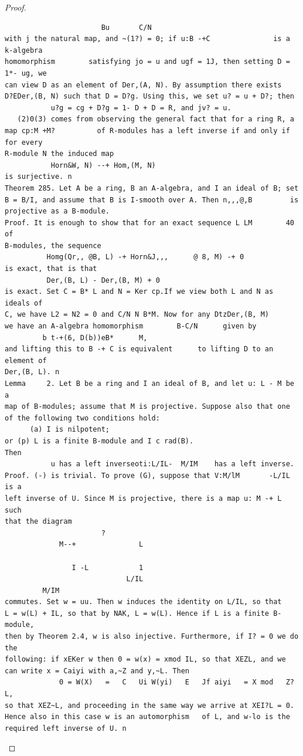 \begin{proof}
\begin{verbatim}
                       Bu       C/N
with j the natural map, and ~(1?) = 0; if u:B -+C               is a k-algebra
homomorphism        satisfying jo = u and ugf = 1J, then setting D = 1*- ug, we
can view D as an element of Der,(A, N). By assumption there exists
D?EDer,(B, N) such that D = D?g. Using this, we set u? = u + D?; then
           u?g = cg + D?g = 1- D + D = R, and jv? = u.
   (2)0(3) comes from observing the general fact that for a ring R, a
map cp:M +M?          of R-modules has a left inverse if and only if for every
R-module N the induced map
           Horn&W, N) --+ Hom,(M, N)
is surjective. n
Theorem 285. Let A be a ring, B an A-algebra, and I an ideal of B; set
B = B/I, and assume that B is I-smooth over A. Then n,,,@,B         is
projective as a B-module.
Proof. It is enough to show that for an exact sequence L LM        40 of
B-modules, the sequence
          Homg(Qr,, @B, L) -+ Horn&J,,,      @ 8, M) -+ 0
is exact, that is that
          Der,(B, L) - Der,(B, M) + 0
is exact. Set C = B* L and N = Ker cp.If we view both L and N as ideals of
C, we have L2 = N2 = 0 and C/N N B*M. Now for any DtzDer,(B, M)
we have an A-algebra homomorphism        B-C/N      given by
         b t-+(6, D(b))eB*      M,
and lifting this to B -+ C is equivalent      to lifting D to an element of
Der,(B, L). n
Lemma     2. Let B be a ring and I an ideal of B, and let u: L - M be a
map of B-modules; assume that M is projective. Suppose also that one
of the following two conditions hold:
      (a) I is nilpotent;
or (p) L is a finite B-module and I c rad(B).
Then
           u has a left inverseoti:L/IL-  M/IM    has a left inverse.
Proof. (-) is trivial. To prove (G), suppose that V:M/lM       -L/IL  is a
left inverse of U. Since M is projective, there is a map u: M -+ L such
that the diagram
                       ?
             M--+               L

                I -L            1
                             L/IL
         M/IM
commutes. Set w = uu. Then w induces the identity on L/IL, so that
L = w(L) + IL, so that by NAK, L = w(L). Hence if L is a finite B-module,
then by Theorem 2.4, w is also injective. Furthermore, if I? = 0 we do the
following: if xEKer w then 0 = w(x) = xmod IL, so that XEZL, and we
can write x = Caiyi with a,~Z and y,~L. Then
             0 = W(X)   =   C   Ui W(yi)   E   Jf aiyi   = X mod   Z?L,
so that XEZ~L, and proceeding in the same way we arrive at XEI?L = 0.
Hence also in this case w is an automorphism   of L, and w-lo is the
required left inverse of U. n
\end{verbatim}
\end{proof}


